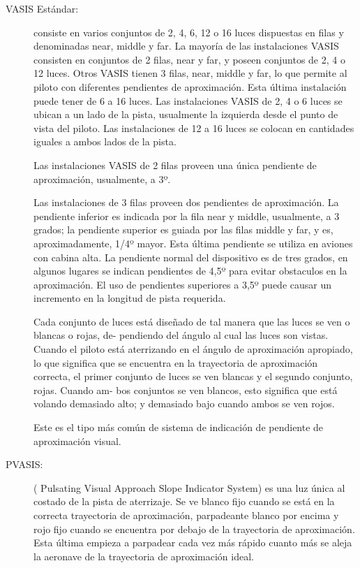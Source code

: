 \begin{description}

\item[VASIS Estándar:] consiste en varios conjuntos de 2, 4, 6, 12 o 16 luces dispuestas en filas y
denominadas near, middle y far. La mayoría de las instalaciones VASIS consisten en conjuntos
de 2 filas, near y far, y poseen conjuntos de 2, 4 o 12 luces. Otros VASIS tienen 3 filas, near,
middle y far, lo que permite al piloto con diferentes pendientes de aproximación. Esta última
instalación puede tener de 6 a 16 luces. Las instalaciones VASIS de 2, 4 o 6 luces se ubican a un
lado de la pista, usualmente la izquierda desde el punto de vista del piloto. Las instalaciones
de 12 a 16 luces se colocan en cantidades iguales a ambos lados de la pista.

Las instalaciones VASIS de 2 filas proveen una única pendiente de aproximación, usualmente,
a 3º.

Las instalaciones de 3 filas proveen dos pendientes de aproximación. La pendiente
inferior es indicada por la fila near y middle, usualmente, a 3 grados; la pendiente superior
es guiada por las filas middle y far, y es, aproximadamente, 1/4º mayor. Esta última
pendiente se utiliza en aviones con cabina alta. La pendiente normal del dispositivo es de tres
grados, en algunos lugares se indican pendientes de 4,5º para evitar obstaculos en la
aproximación. El uso de pendientes superiores a 3,5º puede causar un incremento en la
longitud de pista requerida.

Cada conjunto de luces está diseñado de tal manera que las luces se ven o blancas o rojas, de-
pendiendo del ángulo al cual las luces son vistas. Cuando el piloto está aterrizando en el ángulo
de aproximación apropiado, lo que significa que se encuentra en la trayectoria de aproximación
correcta, el primer conjunto de luces se ven blancas y el segundo conjunto, rojas. Cuando am-
bos conjuntos se ven blancos, esto significa que está volando demasiado alto; y demasiado bajo
cuando ambos se ven rojos.

Este es el tipo más común de sistema de indicación de pendiente
de aproximación visual.

\item[PVASIS:] ( Pulsating Visual Approach Slope Indicator System) es una
luz única al costado de la pista de aterrizaje. Se ve blanco fijo cuando se está en la correcta
trayectoria de aproximación, parpadeante blanco por encima y rojo fijo cuando se encuentra
por debajo de la trayectoria de aproximación. Esta última empieza a parpadear cada vez más
rápido cuanto más se aleja la aeronave de la trayectoria de aproximación ideal.


\end{description}
